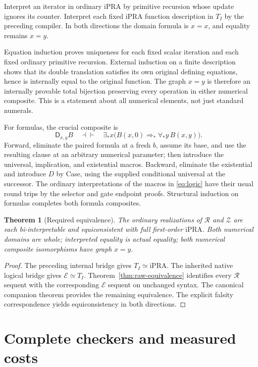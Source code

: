 \documentclass[11pt]{article}
\newtheorem{theorem}{Theorem}[section]
\theoremstyle{definition}
\newcommand{\ipra}{\mathrm{iPRA}}
\newcommand{\Raw}{\mathcal R}
\newcommand{\Can}{\mathcal Z}
\newcommand{\Old}{\mathcal E}
\newcommand{\D}{\mathsf D}
\begin{document}
Interpret an iterator in ordinary iPRA by primitive recursion whose
update ignores its counter. Interpret each fixed iPRA function description
in $T_I$ by the preceding compiler. In both directions the domain formula
is $x=x$, and equality remains $x=y$.

Equation induction proves uniqueness for each fixed scalar iteration and
each fixed ordinary primitive recursion. External induction on a finite
description shows that its double translation satisfies its own original
defining equations, hence is internally equal to the original function.
The graph $x=y$ is therefore an internally provable total bijection
preserving every operation in either numerical composite. This is a
statement about all numerical elements, not just standard numerals.

For formulas, the crucial composite is
\[
 \D_{x,y}B\quad\dashv\vdash\quad
 \exists_*x\bigl(B(x,0)\Rightarrow_*\forall_*y\,B(x,y)\bigr).
\tag{DC}\label{eq:dc}
\]
Forward, eliminate the paired formula at a fresh $b$, assume its base,
and use the resulting clause at an arbitrary numerical parameter; then
introduce the universal, implication, and existential macros. Backward,
eliminate the existential and introduce $D$ by Case, using the supplied
conditional universal at the successor. The ordinary interpretations of
the macros in \eqref{eq:logic} have their usual round trips by the
selector and gate endpoint proofs. Structural induction on formulas
completes both formula composites.

\begin{theorem}[Required equivalence]
The ordinary realizations of $\Raw$ and $\Can$ are each bi-interpretable
and equiconsistent with full first-order $\ipra$. Both numerical domains
are whole; interpreted equality is actual equality; both numerical
composite isomorphisms have graph $x=y$.
\end{theorem}
\begin{proof}
The preceding internal bridge gives $T_I\simeq\ipra$.
The inherited native logical bridge gives $\Old\simeq T_I$.
Theorem~\ref{thm:raw-equivalence} identifies every $\Raw$ sequent with
the corresponding $\Old$ sequent on unchanged syntax. The canonical
companion theorem provides the remaining equivalence. The explicit
falsity correspondence yields equiconsistency in both directions.
\end{proof}

\section{Complete checkers and measured costs}
\label{sec:implementation}
\end{document}
